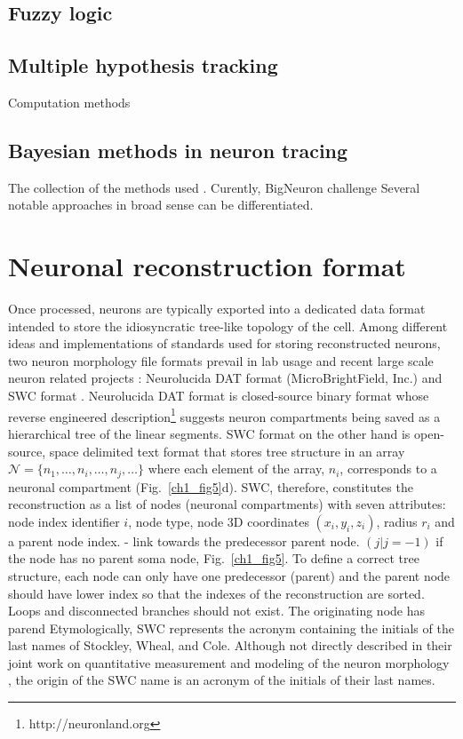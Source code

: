 \subsection{Fuzzy logic }

\subsection{Multiple hypothesis tracking}
Computation methods

\subsection{Bayesian methods in neuron tracing} 
The collection of the methods used . Curently, BigNeuron challenge Several notable approaches in broad sense can be differentiated. 


\section{Neuronal reconstruction format}
Once processed, neurons are typically exported into a dedicated data format intended to store the idiosyncratic tree-like topology of the cell. Among different ideas and implementations of standards used for storing reconstructed neurons, two neuron morphology file formats prevail in lab usage and recent large scale neuron related projects \cite{bakker2016web}: Neurolucida DAT format (MicroBrightField, Inc.) and SWC format \cite{cannon1998line}. Neurolucida DAT format is closed-source binary format whose reverse engineered description\footnote{http://neuronland.org} suggests neuron compartments being saved as a hierarchical tree of the linear segments. SWC format on the other hand is open-source, space delimited text format that stores tree structure in an array $\mathcal{N} = \{ n_1, \dots , n_i, \dots , n_j, \dots  \}$ where each element of the array, $n_i$, corresponds to a neuronal compartment (Fig.~\ref{ch1_fig5}d). SWC, therefore, constitutes the reconstruction as a list of nodes (neuronal compartments) with seven attributes: node index identifier $i$, node type, node 3D coordinates $(x_i,y_i,z_i)$, radius $r_i$ and a parent node index.  - link towards the predecessor parent node. $(j | j=-1)$ if the node has no parent soma node, Fig.~\ref{ch1_fig5}. To define a correct tree structure, each node can only have one predecessor (parent) and the parent node should have lower index so that the indexes of the reconstruction are sorted. Loops and disconnected branches should not exist. The originating node has parend  Etymologically, SWC represents the acronym containing the initials of the last names of Stockley, Wheal, and Cole. Although not directly described in their joint work on quantitative measurement and modeling of the neuron morphology \cite{stockley1993system}, the origin of the SWC name is an acronym of the initials of their last names. 

